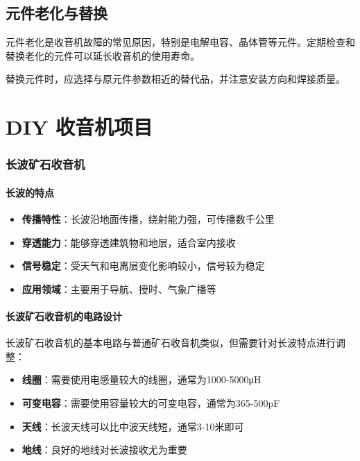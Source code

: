 \documentclass[12pt,UTF8]{ctexbook}
\begin{document}
\section{元件老化与替换}

元件老化是收音机故障的常见原因，特别是电解电容、晶体管等元件。定期检查和替换老化的元件可以延长收音机的使用寿命。

替换元件时，应选择与原元件参数相近的替代品，并注意安装方向和焊接质量。





\chapter{DIY 收音机项目}

\subsection{长波矿石收音机}

\subsubsection{长波的特点}
\begin{itemize}[leftmargin=3.5em]
    \item \textbf{传播特性}：长波沿地面传播，绕射能力强，可传播数千公里
    \item \textbf{穿透能力}：能够穿透建筑物和地层，适合室内接收
    \item \textbf{信号稳定}：受天气和电离层变化影响较小，信号较为稳定
    \item \textbf{应用领域}：主要用于导航、授时、气象广播等
\end{itemize}

\subsubsection{长波矿石收音机的电路设计}

长波矿石收音机的基本电路与普通矿石收音机类似，但需要针对长波特点进行调整：

\begin{itemize}[leftmargin=3.5em]
    \item \textbf{线圈}：需要使用电感量较大的线圈，通常为1000-5000μH
    \item \textbf{可变电容}：需要使用容量较大的可变电容，通常为365-500pF
    \item \textbf{天线}：长波天线可以比中波天线短，通常3-10米即可
    \item \textbf{地线}：良好的地线对长波接收尤为重要
\end{itemize}
\end{document}

